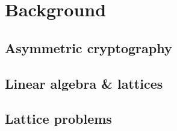 \chapter{Background}

\section{Asymmetric cryptography}

\section{Linear algebra \& lattices}

\section{Lattice problems}
